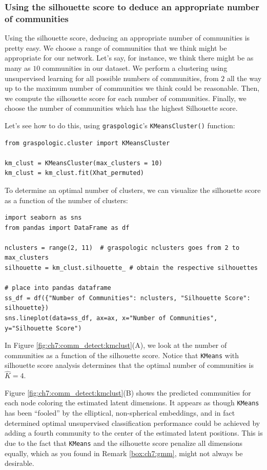 \subsubsection{Using the silhouette score to deduce an appropriate number of communities}

Using the silhouette score, deducing an appropriate number of communities is pretty easy. We choose a range of communities that we think might be appropriate for our network. Let's say, for instance, we think there might be as many as $10$ communities in our dataset. We perform a clustering using unsupervised learning for all possible numbers of communities, from $2$ all the way up to the maximum number of communities we think could be reasonable. Then, we compute the silhouette score for each number of communities. Finally, we choose the number of communities which has the highest Silhouette score. 

Let's see how to do this, using \texttt{graspologic}'s \texttt{KMeansCluster()} function:

\begin{lstlisting}[style=python]
from graspologic.cluster import KMeansCluster

km_clust = KMeansCluster(max_clusters = 10)
km_clust = km_clust.fit(Xhat_permuted)
\end{lstlisting}

To determine an optimal number of clusters, we can visualize the silhouette score as a function of the number of clusters:

\begin{lstlisting}[style=python]
import seaborn as sns
from pandas import DataFrame as df

nclusters = range(2, 11)  # graspologic nclusters goes from 2 to max_clusters
silhouette = km_clust.silhouette_ # obtain the respective silhouettes

# place into pandas dataframe
ss_df = df({"Number of Communities": nclusters, "Silhouette Score": silhouette})
sns.lineplot(data=ss_df, ax=ax, x="Number of Communities", y="Silhouette Score")
\end{lstlisting}

In Figure \ref{fig:ch7:comm_detect:kmclust}(A), we look at the number of communities as a function of the silhouette score. Notice that \texttt{KMeans} with silhouette score analysis determines that the optimal number of communities is $\hat K = 4$. 

Figure \ref{fig:ch7:comm_detect:kmclust}(B) shows the predicted communities for each node coloring the estimated latent dimensions. It appears as though \texttt{KMeans} has been ``fooled'' by the elliptical, non-spherical embeddings, and in fact determined optimal unsupervised classification performance could be achieved by adding a fourth community to the center of the estimated latent positions. This is due to the fact that \texttt{KMeans} and the silhouette score penalize all dimensions equally, which as you found in Remark \ref{box:ch7:gmm}, might not always be desirable. 

